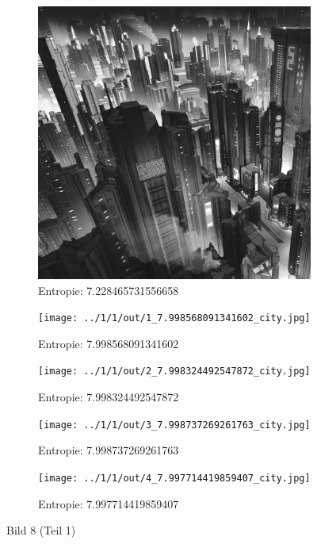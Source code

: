 \begin{figure}
	\centering

	\begin{subfigure}{0.25\textwidth}
		\includegraphics[width=\textwidth]{../1/3/gray_7.228465731556658_city.jpg}
		\caption{Entropie: 7.228465731556658}
	\end{subfigure}

	\begin{subfigure}{0.25\textwidth}
		\texttt{[image: ../1/1/out/1\_7.998568091341602\_city.jpg]}
		\caption{Entropie: 7.998568091341602}
	\end{subfigure}

	\begin{subfigure}{0.25\textwidth}
		\texttt{[image: ../1/1/out/2\_7.998324492547872\_city.jpg]}
		\caption{Entropie: 7.998324492547872}
	\end{subfigure}

	\begin{subfigure}{0.25\textwidth}
		\texttt{[image: ../1/1/out/3\_7.998737269261763\_city.jpg]}
		\caption{Entropie: 7.998737269261763}
	\end{subfigure}

	\begin{subfigure}{0.25\textwidth}
		\texttt{[image: ../1/1/out/4\_7.997714419859407\_city.jpg]}
		\caption{Entropie: 7.997714419859407}
	\end{subfigure}
	\caption{Bild 8 (Teil 1)}
\end{figure}

